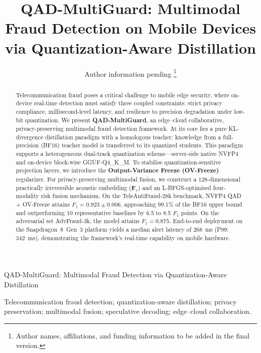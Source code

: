\documentclass[lettersize,journal]{IEEEtran}
\begin{document}
\title{\textbf{QAD-MultiGuard: Multimodal Fraud Detection on Mobile Devices via Quantization-Aware Distillation}}

\author{Author information pending%
\thanks{Author names, affiliations, and funding information to be added in the final version.}}

%
{QAD-MultiGuard: Multimodal Fraud Detection via Quantization-Aware Distillation}

\maketitle

\begin{abstract}
Telecommunication fraud poses a critical challenge to mobile edge security, where on-device real-time detection must satisfy three coupled constraints: strict privacy compliance, millisecond-level latency, and resilience to precision degradation under low-bit quantization. We present \textbf{QAD-MultiGuard}, an edge--cloud collaborative, privacy-preserving multimodal fraud detection framework. At its core lies a pure KL-divergence distillation paradigm with a homologous teacher: knowledge from a full-precision (BF16) teacher model is transferred to its quantized students. This paradigm supports a heterogeneous dual-track quantization scheme---server-side native NVFP4 and on-device block-wise GGUF-Q4\_K\_M. To stabilise quantization-sensitive projection layers, we introduce the \textbf{Output-Variance Freeze (OV-Freeze)} regularizer. For privacy-preserving multimodal fusion, we construct a 128-dimensional practically irreversible acoustic embedding ($\bm{F}_v$) and an L-BFGS-optimised four-modality risk fusion mechanism. On the TeleAntiFraud-28k benchmark, NVFP4 QAD + OV-Freeze attains $F_1 = 0.923 \pm 0.006$, approaching 99.1\% of the BF16 upper bound and outperforming 10 representative baselines by 6.5 to 8.5 $F_1$ points. On the adversarial set AdvFraud-3k, the model attains $F_1 = 0.875$. End-to-end deployment on the Snapdragon~8~Gen~3 platform yields a median alert latency of 268~ms (P99: 342~ms), demonstrating the framework's real-time capability on mobile hardware.
\end{abstract}

\begin{IEEEkeywords}
Telecommunication fraud detection; quantization-aware distillation; privacy preservation; multimodal fusion; speculative decoding; edge--cloud collaboration.
\end{IEEEkeywords}
\end{document}
